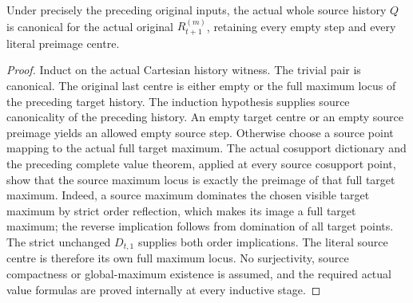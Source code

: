 \begin{theorem}
\label{hir:smooth-original-curve-full-family-canonical}
\leanok
{}
Under precisely the preceding original inputs, the actual whole source
history $Q$ is canonical for the actual original $R^{(m)}_{t+1}$, retaining
every empty step and every literal preimage centre.
\end{theorem}
\begin{proof}
Induct on the actual Cartesian history witness. The trivial pair is
canonical. The original last centre is either empty or the full maximum
locus of the preceding target history. The induction hypothesis supplies
source canonicality of the preceding history. An empty target centre or
an empty source preimage yields an allowed empty source step. Otherwise
choose a source point mapping to the actual full target maximum. The
actual cosupport dictionary and the preceding complete value theorem,
applied at every source cosupport point, show that the source maximum
locus is exactly the preimage of that full target maximum. Indeed, a
source maximum dominates the chosen visible target maximum by strict
order reflection, which makes its image a full target maximum; the
reverse implication follows from domination of all target points.
The strict unchanged $D_{t,1}$ supplies both order implications. The
literal source centre is therefore its own full maximum locus. No
surjectivity, source compactness or global-maximum existence is assumed,
and the required actual value formulas are proved internally at every
inductive stage.
\end{proof}

